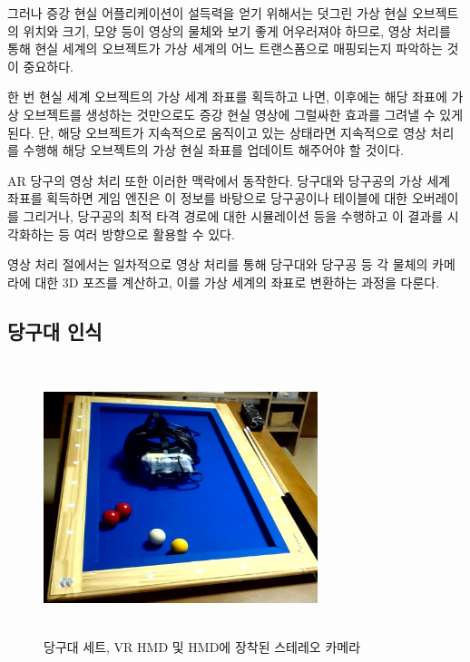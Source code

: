 \documentclass[10pt]{oblivoir}
\begin{document}
그러나 증강 현실 어플리케이션이 설득력을 얻기 위해서는 덧그린 가상 현실 오브젝트의 위치와 크기, 모양 등이 영상의 물체와 보기 좋게 어우러져야 하므로, 영상 처리를 통해 현실 세계의 오브젝트가 가상 세계의 어느 트랜스폼으로 매핑되는지 파악하는 것이 중요하다.

한 번 현실 세계 오브젝트의 가상 세계 좌표를 획득하고 나면, 이후에는 해당 좌표에 가상 오브젝트를 생성하는 것만으로도 증강 현실 영상에 그럴싸한 효과를 그려낼 수 있게 된다. 단, 해당 오브젝트가 지속적으로 움직이고 있는 상태라면 지속적으로 영상 처리를 수행해 해당 오브젝트의 가상 현실 좌표를 업데이트 해주어야 할 것이다.

AR 당구의 영상 처리 또한 이러한 맥락에서 동작한다. 당구대와 당구공의 가상 세계 좌표를 획득하면 게임 엔진은 이 정보를 바탕으로 당구공이나 테이블에 대한 오버레이를 그리거나, 당구공의 최적 타격 경로에 대한 시뮬레이션 등을 수행하고 이 결과를 시각화하는 등 여러 방향으로 활용할 수 있다.

영상 처리 절에서는 일차적으로 영상 처리를 통해 당구대와 당구공 등 각 물체의 카메라에 대한 3D 포즈를 계산하고, 이를 가상 세계의 좌표로 변환하는 과정을 다룬다.

\subsection{당구대 인식}

\label{section;imgproc;table}
\begin{figure}[ht]
    \centering
    \includegraphics[width=8cm, height=8cm, keepaspectratio]{img/billiards-table.png}
    \caption[Caption for LOF]{당구대 세트, VR HMD 및 HMD에 장착된 스테레오 카메라\footnotemark}
    \label{fig;pool-table}
\end{figure}

\end{document}
